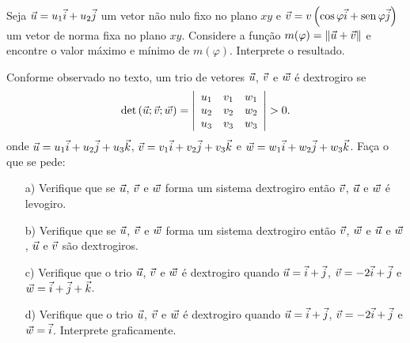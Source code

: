 \begin{prob}\label{probmaxmin} Seja $\vec{u}=u_1\vec{i} + u_2\vec{j}$ um vetor não nulo fixo no plano $xy$ e $\vec{v}=v\left(\cos\varphi \vec{i}+\operatorname{sen}\varphi \vec{j}\right)$ um vetor de norma fixa no plano $xy$. Considere a função $m(\varphi)=\|\vec{u}+\vec{v}\|$ e encontre o valor máximo e mínimo de $m(\varphi)$. Interprete o resultado.
\end{prob}

\begin{prob}\label{probdextro} Conforme observado no texto, um trio de vetores $\vec{u}$, $\vec{v}$ e $\vec{w}$ é dextrogiro se
\begin{equation*}
\det\left(\vct{u};\vct{v};\vct{w}\right)= \left|\begin{array}{ccc}
u_1&v_1&w_1\\
u_2&v_2&w_2\\
u_3&v_3&w_3
\end{array}
\right|>0.
\end{equation*}   
onde $\vec{u}=u_1\vec{i}+u_2\vec{j}+u_3\vec{k}$, $\vec{v}=v_1\vec{i}+v_2\vec{j}+v_3\vec{k}$ e $\vec{w}=w_1\vec{i}+w_2\vec{j}+w_3\vec{k}$. Faça o que se pede:
\begin{itemize}
\item [a)]Verifique que se $\vec{u}$, $\vec{v}$ e $\vec{w}$ forma um sistema dextrogiro então $\vec{v}$, $\vec{u}$ e $\vec{w}$ é levogiro.
\item [b)]Verifique que se $\vec{u}$, $\vec{v}$ e $\vec{w}$ forma um sistema dextrogiro então $\vec{v}$, $\vec{w}$ e $\vec{u}$ e $\vec{w}$, $\vec{u}$ e $\vec{v}$ são dextrogiros. 
\item [c)]Verifique que o trio $\vec{u}$, $\vec{v}$ e $\vec{w}$ é dextrogiro quando $\vec{u}=\vec{i}+\vec{j}$, $\vec{v}=-2\vec{i}+\vec{j}$ e $\vec{w}=\vec{i}+\vec{j}+\vec{k}$. 
\item [d)]Verifique que o trio $\vec{u}$, $\vec{v}$ e $\vec{w}$ é dextrogiro quando $\vec{u}=\vec{i}+\vec{j}$, $\vec{v}=-2\vec{i}+\vec{j}$ e $\vec{w}=\vec{i}$. Interprete graficamente.
\end{itemize}
\end{prob}




